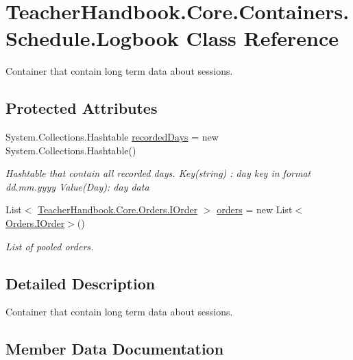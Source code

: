\hypertarget{class_teacher_handbook_1_1_core_1_1_containers_1_1_schedule_1_1_logbook}{}\section{Teacher\+Handbook.\+Core.\+Containers.\+Schedule.\+Logbook Class Reference}
\label{class_teacher_handbook_1_1_core_1_1_containers_1_1_schedule_1_1_logbook}


Container that contain long term data about sessions.  


\subsection*{Protected Attributes}
\begin{DoxyCompactItemize}
\item 
System.\+Collections.\+Hashtable \mbox{\hyperlink{class_teacher_handbook_1_1_core_1_1_containers_1_1_schedule_1_1_logbook_ac848ae0c5ec991bae660417d0b96a13c}{recorded\+Days}} = new System.\+Collections.\+Hashtable()
\begin{DoxyCompactList}\small\item\em Hashtable that contain all recorded days. Key(string) \+: day key in format dd.\+mm.\+yyyy Value(\+Day)\+: day data \end{DoxyCompactList}\item 
List$<$ \mbox{\hyperlink{interface_teacher_handbook_1_1_core_1_1_orders_1_1_i_order}{Teacher\+Handbook.\+Core.\+Orders.\+I\+Order}} $>$ \mbox{\hyperlink{class_teacher_handbook_1_1_core_1_1_containers_1_1_schedule_1_1_logbook_a563af1c666ffd5e11808ed38b7f2ed83}{orders}} = new List$<$\mbox{\hyperlink{interface_teacher_handbook_1_1_core_1_1_orders_1_1_i_order}{Orders.\+I\+Order}}$>$()
\begin{DoxyCompactList}\small\item\em List of pooled orders. \end{DoxyCompactList}\end{DoxyCompactItemize}


\subsection{Detailed Description}
Container that contain long term data about sessions. 



\subsection{Member Data Documentation}
\mbox{\label{class_teacher_handbook_1_1_core_1_1_containers_1_1_schedule_1_1_logbook_a563af1c666ffd5e11808ed38b7f2ed83}} 
